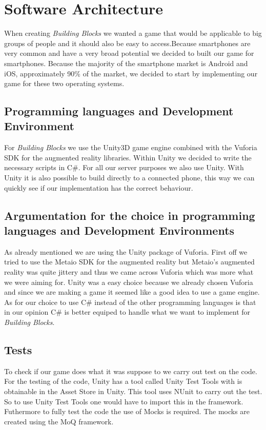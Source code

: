 \documentclass[a4paper,titlepage]{scrartcl}
\begin{document}
\section{Software Architecture}
When creating \textit{Building Blocks} we wanted a game that would be applicable to big groups of people and it should also be easy to access.Because smartphones are very common and have a very broad potential we decided to built our game for smartphones. Because the majority of the smartphone market is Android and iOS, approximately 90\% of the market\cite{smartphoneMarket}, we decided to start by implementing our game for these two operating systems.

\subsection{Programming languages and Development Environment}
For \textit{Building Blocks} we use the Unity3D game engine combined with the Vuforia SDK for the augmented reality libraries. Within Unity we decided to write the necessary scripts in C\#. For all our server purposes we also use Unity. With Unity it is also possible to build directly to a connected phone, this way we can quickly see if our implementation has the correct behaviour.

\subsection{Argumentation for the  choice in programming languages and Development Environments}
As already mentioned we are using the Unity package of Vuforia. First off we tried to use the Metaio SDK for the augmented reality but Metaio's augmented reality was quite jittery and thus we came across Vuforia which was more what we were aiming for. Unity was a easy choice because we already chosen Vuforia and since we are making a game it seemed like a good idea to use a game engine. As for our choice to use C\# instead of the other programming languages is that in our opinion C\# is better equiped to handle what we want to implement for \textit{Building Blocks}.

\subsection{Tests}
To check if our game does what it was suppose to we carry out test on the code. For the testing of the code, Unity has a tool called Unity Test Tools with is obtainable in the Asset Store in Unity. This tool uses NUnit to carry out the test. So to use Unity Test Tools one would have to import this in the framework. Futhermore to fully test the code the use of Mocks is required. The mocks are created using the MoQ framework.
\end{document}

